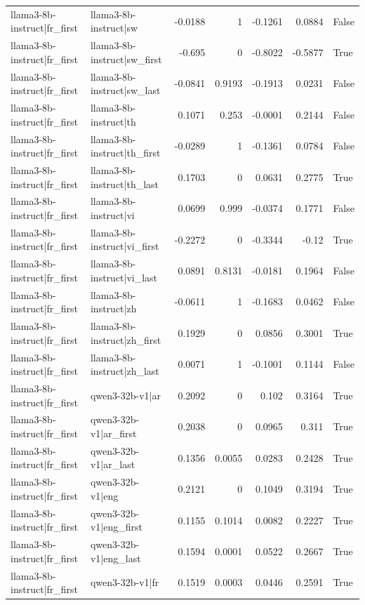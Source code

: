 \begin{table}
\begin{tabular}{l l r r r r l}
llama3-8b-instruct|fr_first & llama3-8b-instruct|sw & -0.0188 & 1 & -0.1261 & 0.0884 & False \\
llama3-8b-instruct|fr_first & llama3-8b-instruct|sw_first & -0.695 & 0 & -0.8022 & -0.5877 & True \\
llama3-8b-instruct|fr_first & llama3-8b-instruct|sw_last & -0.0841 & 0.9193 & -0.1913 & 0.0231 & False \\
llama3-8b-instruct|fr_first & llama3-8b-instruct|th & 0.1071 & 0.253 & -0.0001 & 0.2144 & False \\
llama3-8b-instruct|fr_first & llama3-8b-instruct|th_first & -0.0289 & 1 & -0.1361 & 0.0784 & False \\
llama3-8b-instruct|fr_first & llama3-8b-instruct|th_last & 0.1703 & 0 & 0.0631 & 0.2775 & True \\
llama3-8b-instruct|fr_first & llama3-8b-instruct|vi & 0.0699 & 0.999 & -0.0374 & 0.1771 & False \\
llama3-8b-instruct|fr_first & llama3-8b-instruct|vi_first & -0.2272 & 0 & -0.3344 & -0.12 & True \\
llama3-8b-instruct|fr_first & llama3-8b-instruct|vi_last & 0.0891 & 0.8131 & -0.0181 & 0.1964 & False \\
llama3-8b-instruct|fr_first & llama3-8b-instruct|zh & -0.0611 & 1 & -0.1683 & 0.0462 & False \\
llama3-8b-instruct|fr_first & llama3-8b-instruct|zh_first & 0.1929 & 0 & 0.0856 & 0.3001 & True \\
llama3-8b-instruct|fr_first & llama3-8b-instruct|zh_last & 0.0071 & 1 & -0.1001 & 0.1144 & False \\
llama3-8b-instruct|fr_first & qwen3-32b-v1|ar & 0.2092 & 0 & 0.102 & 0.3164 & True \\
llama3-8b-instruct|fr_first & qwen3-32b-v1|ar_first & 0.2038 & 0 & 0.0965 & 0.311 & True \\
llama3-8b-instruct|fr_first & qwen3-32b-v1|ar_last & 0.1356 & 0.0055 & 0.0283 & 0.2428 & True \\
llama3-8b-instruct|fr_first & qwen3-32b-v1|eng & 0.2121 & 0 & 0.1049 & 0.3194 & True \\
llama3-8b-instruct|fr_first & qwen3-32b-v1|eng_first & 0.1155 & 0.1014 & 0.0082 & 0.2227 & True \\
llama3-8b-instruct|fr_first & qwen3-32b-v1|eng_last & 0.1594 & 0.0001 & 0.0522 & 0.2667 & True \\
llama3-8b-instruct|fr_first & qwen3-32b-v1|fr & 0.1519 & 0.0003 & 0.0446 & 0.2591 & True \\

\end{tabular}
\end{table}
